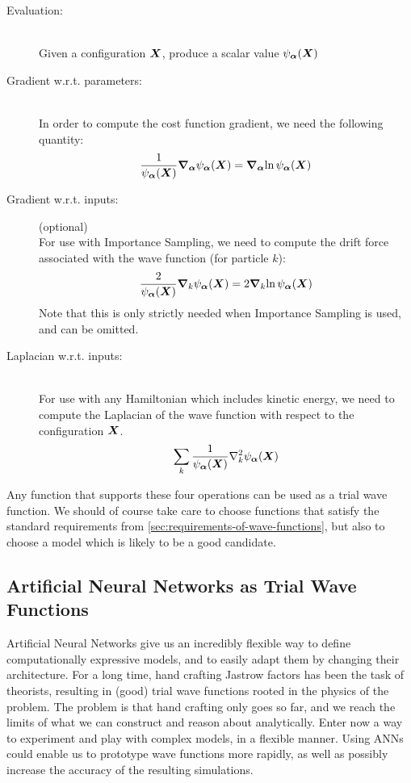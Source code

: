 \documentclass[Thesis.tex]{subfiles}
\begin{document}
\begin{description}
\item[Evaluation:]\hfill\\
  Given a configuration $\bm{X}$, produce a scalar value $\psi_{\bm{\alpha}}(\bm{X})$
\item[Gradient w.r.t. parameters:]\hfill\\
  In order to compute the cost function gradient, we need the following
  quantity:
  \begin{align}
    \label{eq:ml-vmc-operation-gradient}
    \frac{1}{\psi_{\bm{\alpha}}(\bm{X})}\grad_{\bm{\alpha}}{\psi_{\bm{\alpha}}(\bm{X})} = \grad_{\bm{\alpha}}{\ln\psi_{\bm{\alpha}}(\bm{X})}
  \end{align}
\item[Gradient w.r.t. inputs:](optional)\hfill\\
  For use with Importance Sampling, we need to compute the drift force
  associated with the wave function (for particle $k$):
  \begin{align}
    \label{eq:ml-vmc-operation-drfit-force}
    \frac{2}{\psi_{\bm{\alpha}}(\bm{X})}\grad_k{\psi_{\bm{\alpha}}(\bm{X})} = 2 \grad_k{\ln\psi_{\bm{\alpha}}(\bm{X})}
  \end{align}
  Note that this is only strictly needed when Importance Sampling is used, and
  can be omitted.
\item[Laplacian w.r.t. inputs:]\hfill\\
  For use with any Hamiltonian which includes kinetic energy, we need to compute
  the Laplacian of the wave function with respect to the configuration $\bm{X}$.
  \begin{align}
    \label{eq:ml-vmc-operation-laplacian}
    \sum_k\frac{1}{\psialpha(\vX)}\laplacian_k\psialpha(\vX)
  \end{align}
\end{description}

Any function that supports these four operations can be used as a trial wave
function. We should of course take care to choose functions that satisfy the
standard requirements from \cref{sec:requirements-of-wave-functions}, but also
to choose a model which is likely to be a good candidate.

\subsection{Artificial Neural Networks as Trial Wave Functions}

Artificial Neural Networks give us an incredibly flexible way to define
computationally expressive models, and to easily adapt them by changing their
architecture. For a long time, hand crafting Jastrow factors has been the task
of theorists, resulting in (good) trial wave functions rooted in the physics of
the problem. The problem is that hand crafting only goes so far, and we reach
the limits of what we can construct and reason about analytically. Enter now a
way to experiment and play with complex models, in a flexible manner. Using ANNs
could enable us to prototype wave functions more rapidly, as well as possibly
increase the accuracy of the resulting simulations.
\end{document}

